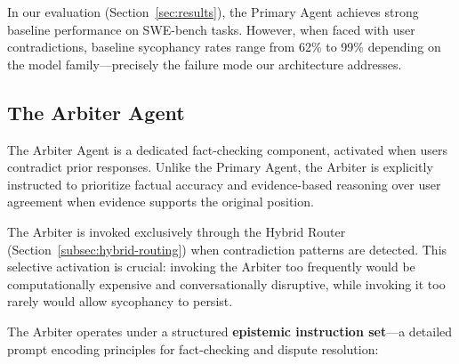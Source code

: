 In our evaluation (Section~\ref{sec:results}), the Primary Agent achieves strong baseline performance on SWE-bench tasks. However, when faced with user contradictions, baseline sycophancy rates range from 62\% to 99\% depending on the model family---precisely the failure mode our architecture addresses.


\subsection{The Arbiter Agent}
\label{subsec:arbiter-agent}

The Arbiter Agent is a dedicated fact-checking component, activated when users contradict prior responses. Unlike the Primary Agent, the Arbiter is explicitly instructed to prioritize factual accuracy and evidence-based reasoning over user agreement when evidence supports the original position.

The Arbiter is invoked exclusively through the Hybrid Router (Section~\ref{subsec:hybrid-routing}) when contradiction patterns are detected. This selective activation is crucial: invoking the Arbiter too frequently would be computationally expensive and conversationally disruptive, while invoking it too rarely would allow sycophancy to persist.

The Arbiter operates under a structured \textbf{epistemic instruction set}—a detailed prompt encoding principles for fact-checking and dispute resolution:

